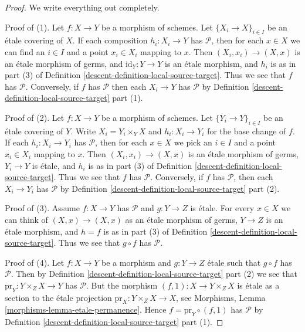 \begin{proof}

We write everything out completely.

\medskip\noindent
Proof of (1). Let $f : X \to Y$ be a morphism of schemes.
Let $\{X_i \to X\}_{i \in I}$ be an \'etale covering of $X$. If each composition
$h_i : X_i \to Y$ has $\mathcal{P}$, then for each $x \in X$ we can find
an $i \in I$ and a point $x_i \in X_i$ mapping to $x$. Then
$(X_i, x_i) \to (X, x)$ is an \'etale morphism of germs, and
$\text{id}_Y : Y \to Y$ is an \'etale morphism, and $h_i$ is as in part (3) of
Definition \ref{descent-definition-local-source-target}.
Thus we see that $f$ has $\mathcal{P}$.
Conversely, if $f$ has $\mathcal{P}$ then each $X_i \to Y$ has
$\mathcal{P}$ by
Definition \ref{descent-definition-local-source-target} part (1).

\medskip\noindent
Proof of (2). Let $f : X \to Y$ be a morphism of schemes.
Let $\{Y_i \to Y\}_{i \in I}$ be an \'etale covering of $Y$.
Write $X_i = Y_i \times_Y X$ and $h_i : X_i \to Y_i$ for the base change
of $f$.  If each  $h_i : X_i \to Y_i$ has $\mathcal{P}$, then for each
$x \in X$ we pick an $i \in I$ and a point $x_i \in X_i$ mapping to $x$.
Then $(X_i, x_i) \to (X, x)$ is an \'etale morphism of germs, $Y_i \to Y$ is
\'etale, and $h_i$ is as in part (3) of
Definition \ref{descent-definition-local-source-target}.
Thus we see that $f$ has $\mathcal{P}$.
Conversely, if $f$ has $\mathcal{P}$, then each $X_i \to Y_i$ has
$\mathcal{P}$ by
Definition \ref{descent-definition-local-source-target} part (2).

\medskip\noindent
Proof of (3). Assume $f : X \to Y$ has $\mathcal{P}$ and $g : Y \to Z$ is
\'etale. For every $x \in X$ we can think of $(X, x) \to (X, x)$ as an
\'etale morphism of germs, $Y \to Z$ is an \'etale morphism, and $h = f$ is as
in part (3) of
Definition \ref{descent-definition-local-source-target}.
Thus we see that $g \circ f$ has $\mathcal{P}$.

\medskip\noindent
Proof of (4). Let $f : X \to Y$ be a morphism and $g : Y \to Z$ \'etale
such that $g \circ f$ has $\mathcal{P}$. Then by
Definition \ref{descent-definition-local-source-target} part (2)
we see that $\text{pr}_Y : Y \times_Z X \to Y$ has $\mathcal{P}$. But
the morphism $(f, 1) : X \to Y \times_Z X$ is \'etale as a section to the
\'etale projection $\text{pr}_X : Y \times_Z X \to X$, see
Morphisms, Lemma \ref{morphisms-lemma-etale-permanence}.
Hence $f = \text{pr}_Y \circ (f, 1)$ has $\mathcal{P}$ by
Definition \ref{descent-definition-local-source-target} part (1).
\end{proof}

